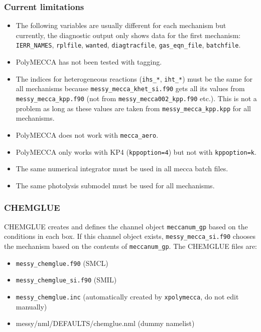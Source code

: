 \documentclass[a4paper,twoside]{article}
\begin{document}
\subsubsection{Current limitations}

\begin{itemize}
\item The following variables are usually different for each mechanism
  but currently, the diagnostic output only shows data for the first
  mechanism: \verb|IERR_NAMES|, \verb|rplfile|, \verb|wanted|,
  \verb|diagtracfile|, \verb|gas_eqn_file|, \verb|batchfile|.
\item PolyMECCA has not been tested with tagging.
\item The indices for heterogeneous reactions (\verb|ihs_*|,
  \verb|iht_*|) must be the same for all mechanisms because
  \verb|messy_mecca_khet_si.f90| gets all its values from
  \verb|messy_mecca_kpp.f90| (not from \verb|messy_mecca002_kpp.f90|
  etc.). This is not a problem as long as these values are taken from
  \verb|messy_mecca_kpp.kpp| for all mechanisms.
\item PolyMECCA does not work with \verb|mecca_aero|.
\item PolyMECCA only works with KP4 (\verb|kppoption=4|) but not with
  \verb|kppoption=k|.
\item The same numerical integrator must be used in all mecca batch
  files.
\item The same photolysis submodel must be used for all mechanisms.
\end{itemize}

\subsubsection{CHEMGLUE}
\label{sec:chemglue}

CHEMGLUE creates and defines the channel object \verb|meccanum_gp| based
on the conditions in each box. If this channel object exists,
\verb|messy_mecca_si.f90| chooses the mechanism based on the contents of
\verb|meccanum_gp|. The CHEMGLUE files are:
\begin{itemize}
\item \verb|messy_chemglue.f90| \hfill (SMCL)
\item \verb|messy_chemglue_si.f90| \hfill (SMIL)
\item \verb|messy_chemglue.inc| \hfill (automatically created by
  \verb|xpolymecca|, do not edit manually)
\item messy/nml/DEFAULTS/chemglue.nml \hfill (dummy namelist)
\end{itemize}
\end{document}
